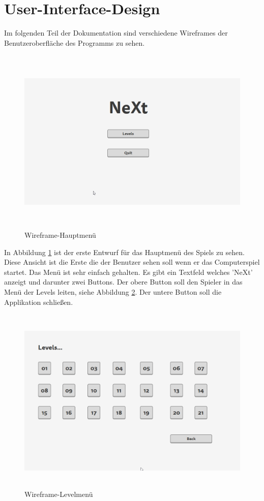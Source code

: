 \section{User-Interface-Design}
Im folgenden Teil der Dokumentation sind verschiedene Wireframes der Benutzeroberfläche des Programms zu sehen.
\begin{figure}[H]
	\centering
	\includegraphics[width=16cm, height=9cm]{images/WireframeMainmenu.png}
	\caption{Wireframe-Hauptmenü}
	\label{WireframeMainmenu}
\end{figure}
In Abbildung \ref{WireframeMainmenu} ist der erste Entwurf für das Hauptmenü des Spiels zu sehen. Diese Ansicht ist die Erste die der Benutzer sehen soll wenn er das Computerspiel startet. Das Menü ist sehr einfach gehalten. Es gibt ein Textfeld welches 'NeXt' anzeigt und darunter zwei Buttons. Der obere Button soll  den Spieler in das Menü der Levels leiten, siehe Abbildung \ref{WireframeLevelsmenu}. Der untere Button soll  die Applikation schließen.
\begin{figure}[H]
	\centering
	\includegraphics[width=16cm, height=9cm]{images/WireframeLevelsmenu.png}
	\caption{Wireframe-Levelmenü}
	\label{WireframeLevelsmenu}
\end{figure}

